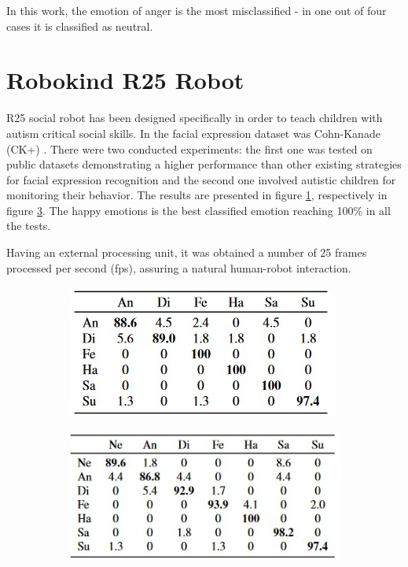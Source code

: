 \documentclass[runningheads,a4paper,12pt]{report}
\begin{document}
In this work, the emotion of anger is the most misclassified - in one out of four cases it is classified as neutral.

\section{Robokind R25 Robot}
R25 social robot has been designed specifically in order to teach children with autism critical social skills. In \cite{automatic-emotion} the facial expression dataset was Cohn-Kanade (CK+) \cite{ck}. There were two conducted experiments: the first one was tested on public datasets demonstrating a higher performance than other existing strategies for facial expression recognition and the second one involved autistic children for monitoring their behavior. The results are presented in figure \ref{fig:ck1}, respectively in figure \ref{fig:ck2}. The happy emotions is the best classified emotion reaching 100\% in all the tests. 

Having an external processing unit, it was obtained a number of 25 frames processed per second (fps), assuring a natural human-robot interaction. 
\begin{figure}
	\centering

  \begin{subfigure}{.45\textwidth}
  	\centering
  	\includegraphics[width=\linewidth]{./images/2_ck1}
  	\caption{}
  	\label{fig:ck1}
  \end{subfigure} 
  \hfill  
  \begin{subfigure}{.45\textwidth}
  	\centering
  	\includegraphics[width=\linewidth]{./images/2_ck2}
  	\caption{}
  	\label{fig:ck2}
  \end{subfigure} 
\end{figure}
\end{document}
